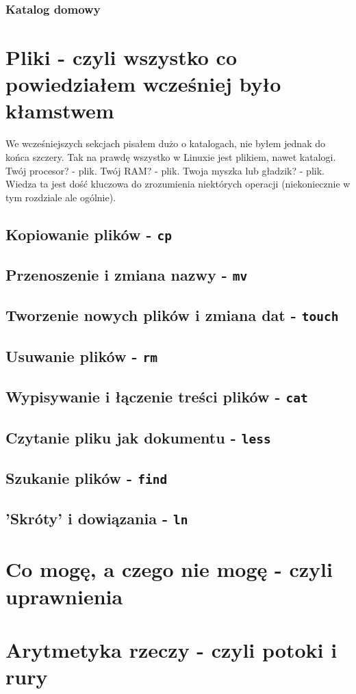 \documentclass[12pt]{article}
\newcommand{\ttbf}[1]{
    \texttt{\textbf{#1}}
}
\begin{document}

\subsubsection{Katalog domowy}

\section{Pliki - czyli wszystko co powiedziałem wcześniej było kłamstwem}
\label{sec:files}

We wcześniejszych sekcjach pisałem dużo o katalogach, nie byłem jednak do końca szczery. Tak na prawdę wszystko w Linuxie jest plikiem, nawet katalogi. Twój procesor? - plik. Twój RAM? - plik. Twoja myszka lub gładzik? - plik. Wiedza ta jest dość kluczowa do zrozumienia niektórych operacji (niekoniecznie w tym rozdziale ale ogólnie).

\subsection{Kopiowanie plików - \ttbf{cp}}

\subsection{Przenoszenie i zmiana nazwy - \ttbf{mv}}

\subsection{Tworzenie nowych plików i zmiana dat - \ttbf{touch}}

\subsection{Usuwanie plików - \ttbf{rm}}

\subsection{Wypisywanie i łączenie treści plików - \ttbf{cat}}

\subsection{Czytanie pliku jak dokumentu - \ttbf{less}}

\subsection{Szukanie plików - \ttbf{find}}

\subsection{'Skróty' i dowiązania - \ttbf{ln}}

\section{Co mogę, a czego nie mogę - czyli uprawnienia}
\label{sec:perms}

\section{Arytmetyka rzeczy - czyli potoki i rury}
\end{document}
